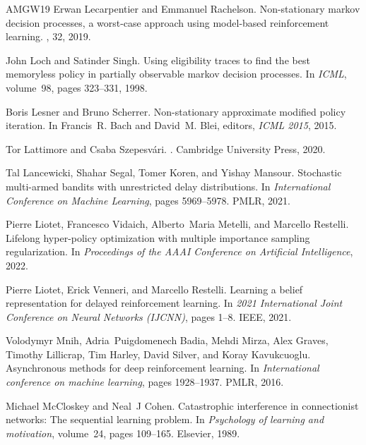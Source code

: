 \begin{thebibliography}{AMGW{\etalchar{+}}19}
Erwan Lecarpentier and Emmanuel Rachelson.
\newblock Non-stationary markov decision processes, a worst-case approach using model-based reinforcement learning.
, 32, 2019.

John Loch and Satinder Singh.
\newblock Using eligibility traces to find the best memoryless policy in partially observable markov decision processes.
\newblock In {\em ICML}, volume~98, pages 323--331, 1998.

Boris Lesner and Bruno Scherrer.
\newblock Non-stationary approximate modified policy iteration.
\newblock In Francis~R. Bach and David~M. Blei, editors, {\em ICML 2015}, 2015.

Tor Lattimore and Csaba Szepesv{\'a}ri.
.
\newblock Cambridge University Press, 2020.

Tal Lancewicki, Shahar Segal, Tomer Koren, and Yishay Mansour.
\newblock Stochastic multi-armed bandits with unrestricted delay distributions.
\newblock In {\em International Conference on Machine Learning}, pages 5969--5978. PMLR, 2021.

Pierre Liotet, Francesco Vidaich, Alberto~Maria Metelli, and Marcello Restelli.
\newblock Lifelong hyper-policy optimization with multiple importance sampling regularization.
\newblock In {\em Proceedings of the AAAI Conference on Artificial Intelligence}, 2022.

Pierre Liotet, Erick Venneri, and Marcello Restelli.
\newblock Learning a belief representation for delayed reinforcement learning.
\newblock In {\em 2021 International Joint Conference on Neural Networks (IJCNN)}, pages 1--8. IEEE, 2021.

Volodymyr Mnih, Adria~Puigdomenech Badia, Mehdi Mirza, Alex Graves, Timothy Lillicrap, Tim Harley, David Silver, and Koray Kavukcuoglu.
\newblock Asynchronous methods for deep reinforcement learning.
\newblock In {\em International conference on machine learning}, pages 1928--1937. PMLR, 2016.

Michael McCloskey and Neal~J Cohen.
\newblock Catastrophic interference in connectionist networks: The sequential learning problem.
\newblock In {\em Psychology of learning and motivation}, volume~24, pages 109--165. Elsevier, 1989.


\end{thebibliography}
